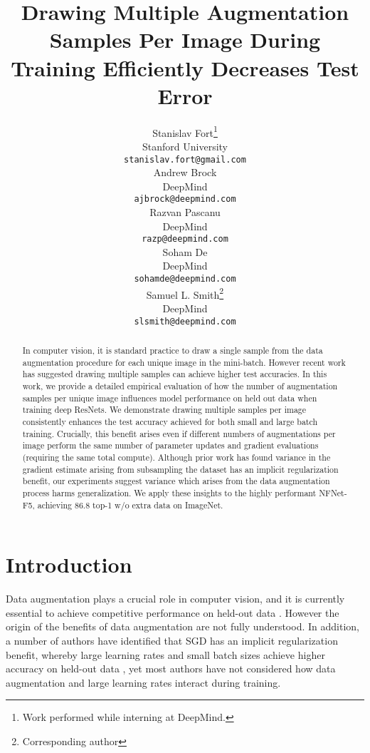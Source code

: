 \documentclass{article}
\title{Drawing Multiple Augmentation Samples Per Image During Training Efficiently Decreases Test Error}
\author{Stanislav Fort\thanks{Work performed while interning at DeepMind.} \\
  Stanford University\\
  \texttt{stanislav.fort@gmail.com} \\
\And
  Andrew Brock  \\
  DeepMind \\
\texttt{ajbrock@deepmind.com} \\
   \AND
  Razvan Pascanu \\
  DeepMind \\
\texttt{razp@deepmind.com} \\
   \And
  Soham De \\
  DeepMind \\
\texttt{sohamde@deepmind.com} \\
   \And
   Samuel L. Smith\thanks{Corresponding author} \\
  DeepMind \\
\texttt{slsmith@deepmind.com} \\
}
\begin{document}
\maketitle


\begin{abstract}
In computer vision, it is standard practice to draw a single sample from the data augmentation procedure for each unique image in the mini-batch. However recent work has suggested drawing multiple samples can achieve higher test accuracies. In this work, we provide a detailed empirical evaluation of how the number of augmentation samples per unique image influences model performance on held out data when training deep ResNets. We demonstrate drawing multiple samples per image consistently enhances the test accuracy achieved for both small and large batch training. Crucially, this benefit arises even if different numbers of augmentations per image perform the same number of parameter updates and gradient evaluations (requiring the same total compute). Although prior work has found variance in the gradient estimate arising from subsampling the dataset has an implicit regularization benefit, our experiments suggest variance which arises from the data augmentation process harms generalization. We apply these insights to the highly performant NFNet-F5, achieving 86.8 top-1 w/o extra data on ImageNet.
\end{abstract}

\section{Introduction}

Data augmentation plays a crucial role in computer vision, and it is currently essential to achieve competitive performance on held-out data \citep{shorten2019survey}. However the origin of the benefits of data augmentation are not fully understood. In addition, a number of authors have identified that SGD has an implicit regularization benefit, whereby large learning rates and small batch sizes achieve higher accuracy on held-out data \citep{keskar2016large,mandt2017stochastic, smith2017bayesian, jastrzkebski2017three, chaudhari2018stochastic, li2019towards, smith2021origin}, yet most authors have not considered how data augmentation and large learning rates interact during training. 
\end{document}
